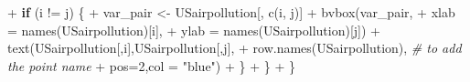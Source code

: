 \documentclass[
]{article}
\newenvironment{Shaded}{\begin{snugshade}}{\end{snugshade}}
\newcommand{\AttributeTok}[1]{\textcolor[rgb]{0.77,0.63,0.00}{#1}}
\newcommand{\CommentTok}[1]{\textcolor[rgb]{0.56,0.35,0.01}{\textit{#1}}}
\newcommand{\ControlFlowTok}[1]{\textcolor[rgb]{0.13,0.29,0.53}{\textbf{#1}}}
\newcommand{\DecValTok}[1]{\textcolor[rgb]{0.00,0.00,0.81}{#1}}
\newcommand{\FunctionTok}[1]{\textcolor[rgb]{0.00,0.00,0.00}{#1}}
\newcommand{\NormalTok}[1]{#1}
\newcommand{\OtherTok}[1]{\textcolor[rgb]{0.56,0.35,0.01}{#1}}
\newcommand{\SpecialCharTok}[1]{\textcolor[rgb]{0.00,0.00,0.00}{#1}}
\newcommand{\StringTok}[1]{\textcolor[rgb]{0.31,0.60,0.02}{#1}}
\begin{document}
\begin{Shaded}
\begin{Highlighting}[]
\SpecialCharTok{+}     \ControlFlowTok{if}\NormalTok{ (i }\SpecialCharTok{!=}\NormalTok{ j) \{}
\SpecialCharTok{+}\NormalTok{       var\_pair }\OtherTok{\textless{}{-}}\NormalTok{ USairpollution[, }\FunctionTok{c}\NormalTok{(i, j)]}
\SpecialCharTok{+}       \FunctionTok{bvbox}\NormalTok{(var\_pair, }
\SpecialCharTok{+}             \AttributeTok{xlab =} \FunctionTok{names}\NormalTok{(USairpollution)[i],}
\SpecialCharTok{+}             \AttributeTok{ylab =} \FunctionTok{names}\NormalTok{(USairpollution)[j])}
\SpecialCharTok{+}       \FunctionTok{text}\NormalTok{(USairpollution[,i],USairpollution[,j],}
\SpecialCharTok{+}           \FunctionTok{row.names}\NormalTok{(USairpollution), }\CommentTok{\# to add the point name}
\SpecialCharTok{+}           \AttributeTok{pos=}\DecValTok{2}\NormalTok{,}\AttributeTok{col =} \StringTok{"blue"}\NormalTok{)}
\SpecialCharTok{+}\NormalTok{     \} }
\SpecialCharTok{+}\NormalTok{   \}}
\SpecialCharTok{+}\NormalTok{ \}}
\end{Highlighting}
\end{Shaded}
\end{document}
